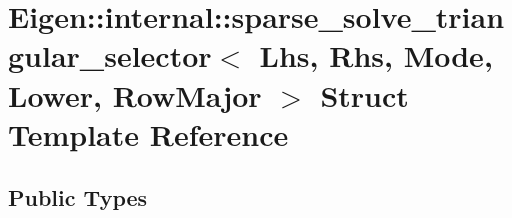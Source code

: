 \hypertarget{struct_eigen_1_1internal_1_1sparse__solve__triangular__selector_3_01_lhs_00_01_rhs_00_01_mode_00_01_lower_00_01_row_major_01_4}{}\section{Eigen\+:\+:internal\+:\+:sparse\+\_\+solve\+\_\+triangular\+\_\+selector$<$ Lhs, Rhs, Mode, Lower, Row\+Major $>$ Struct Template Reference}
\label{struct_eigen_1_1internal_1_1sparse__solve__triangular__selector_3_01_lhs_00_01_rhs_00_01_mode_00_01_lower_00_01_row_major_01_4}
\subsection*{Public Types}
